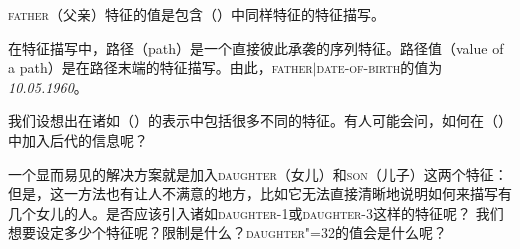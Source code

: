 \z
\textsc{father}（父亲）特征的值是包含（）中同样特征的特征描写。

在特征描写中，路径（path）是一个直接彼此承袭的序列特征。路径值（value of a path）是在路径末端的特征描写。由此，\textsc{father$|$date-of-birth}的值为\emph{10.05.1960}。

我们设想出在诸如（）的表示中包括很多不同的特征。有人可能会问，如何在（）中加入后代的信息呢？

一个显而易见的解决方案就是加入\textsc{daughter}（女儿）和\textsc{son}（儿子）这两个特征：
\ea
{}
\z
但是，这一方法也有让人不满意的地方，比如它无法直接清晰地说明如何来描写有几个女儿的人。是否应该引入诸如\textsc{daughter-1}或\textsc{daughter-3}这样的特征呢？
\ea
{}
\z
我们想要设定多少个特征呢？限制是什么？\textsc{daughter"=32}的值会是什么呢？

